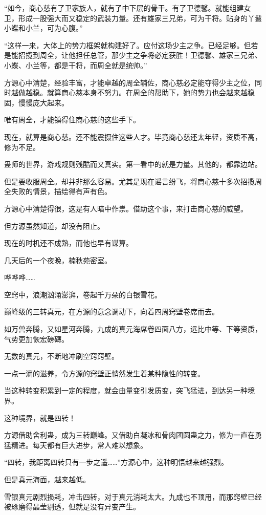\begin{this_body}
“如今，商心慈有了卫家族人，就有了中下层的骨干。有了卫德馨。就能组建女卫，形成一股强大而又稳定的武装力量。还有雄家三兄弟，可为干将。贴身的丫鬟小蝶和小兰，可为心腹。”

“这样一来，大体上的势力框架就构建好了。应付这场少主之争。已经足够。但若是能招揽到周全，让他担任总管，那少主之争将必定获胜！卫德馨、雄家三兄弟、小蝶、小兰等，都是干将，而周全就是统帅。”

方源心中清楚，经验丰富，才能卓越的周全辅佐，商心慈必定能夺得少主之位，同时越做越稳。就算商心慈本身不努力。在周全的帮助下，她的势力也会越来越稳固，慢慢庞大起来。

唯有周全，才能镇得住商心慈的这些手下。

现在，就算是商心慈。还不能震摄住这些人才。毕竟商心慈还太年轻，资质不高，修为不足。

蛊师的世界，游戏规则残酷而又真实。第一看中的就是力量。其他的，都靠边站。

但是要收服周全。却并非那么容易。尤其是现在谣言纷飞，将商心慈十多次招揽周全失败的情景，描绘得有声有色。

方源心中清楚得很，这是有人暗中作祟。借助这个事，来打击商心慈的威望。

但方源虽然知道，却没有阻止。

现在的时机还不成熟，而他也早有谋算。

几天后的一个夜晚，楠秋苑密室。

哗哗哗……

空窍中，浪潮汹涌澎湃，卷起千万朵的白银雪花。

巅峰级的三转真元，在方源的意念调动下，向着四周窍壁卷席而去。

如万兽奔腾，又如星河奔腾，九成的真元海席卷四面八方，远比中等、下等资质，气势更加恢宏磅礴。

无数的真元，不断地冲刷空窍窍壁。

一点一滴的滋养，令方源的窍壁正悄然发生着某种隐性的转变。

当这种转变积累到一定的程度，就会由量变引发质变，突飞猛进，到达另一种境界。

这种境界，就是四转！

方源借助舍利蛊，成为三转巅峰。又借助白凝冰和骨肉团圆蛊之力，修为一直在勇猛精进。每天都有巨大进步，常人难以想象。

“四转，我距离四转只有一步之遥……”方源心中，这种明悟越来越强烈。

但是真元海面，越来越低。

雪银真元剧烈损耗，冲击四转，对于真元消耗太大。九成也不顶用，而那窍壁已经被琢磨得晶莹剔透，但就是没有异变产生。


\end{this_body}
